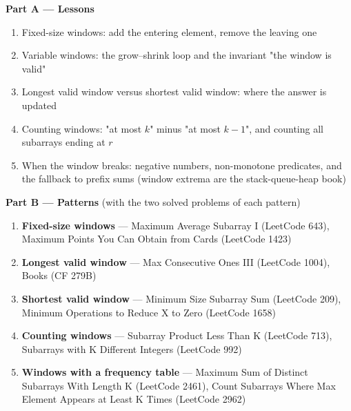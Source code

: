\begin{plannedbox}
\textbf{Part A --- Lessons}
\begin{enumerate}[leftmargin=*, label=\textbf{A\arabic*.}, itemsep=1pt]
    \item Fixed-size windows: add the entering element, remove the leaving one
    \item Variable windows: the grow--shrink loop and the invariant "the window is valid"
    \item Longest valid window versus shortest valid window: where the answer is updated
    \item Counting windows: "at most $k$" minus "at most $k-1$", and counting all subarrays ending at $r$
    \item When the window breaks: negative numbers, non-monotone predicates, and the fallback to prefix sums (window extrema are the stack-queue-heap book)
\end{enumerate}
\textbf{Part B --- Patterns} (with the two solved problems of each pattern)
\begin{enumerate}[leftmargin=*, label=\textbf{P\arabic*.}, itemsep=1pt]
    \item \textbf{Fixed-size windows} --- Maximum Average Subarray I {\small\color{darkgray}(LeetCode 643)}, Maximum Points You Can Obtain from Cards {\small\color{darkgray}(LeetCode 1423)}
    \item \textbf{Longest valid window} --- Max Consecutive Ones III {\small\color{darkgray}(LeetCode 1004)}, Books {\small\color{darkgray}(CF 279B)}
    \item \textbf{Shortest valid window} --- Minimum Size Subarray Sum {\small\color{darkgray}(LeetCode 209)}, Minimum Operations to Reduce X to Zero {\small\color{darkgray}(LeetCode 1658)}
    \item \textbf{Counting windows} --- Subarray Product Less Than K {\small\color{darkgray}(LeetCode 713)}, Subarrays with K Different Integers {\small\color{darkgray}(LeetCode 992)}
    \item \textbf{Windows with a frequency table} --- Maximum Sum of Distinct Subarrays With Length K {\small\color{darkgray}(LeetCode 2461)}, Count Subarrays Where Max Element Appears at Least K Times {\small\color{darkgray}(LeetCode 2962)}
\end{enumerate}
\end{plannedbox}
